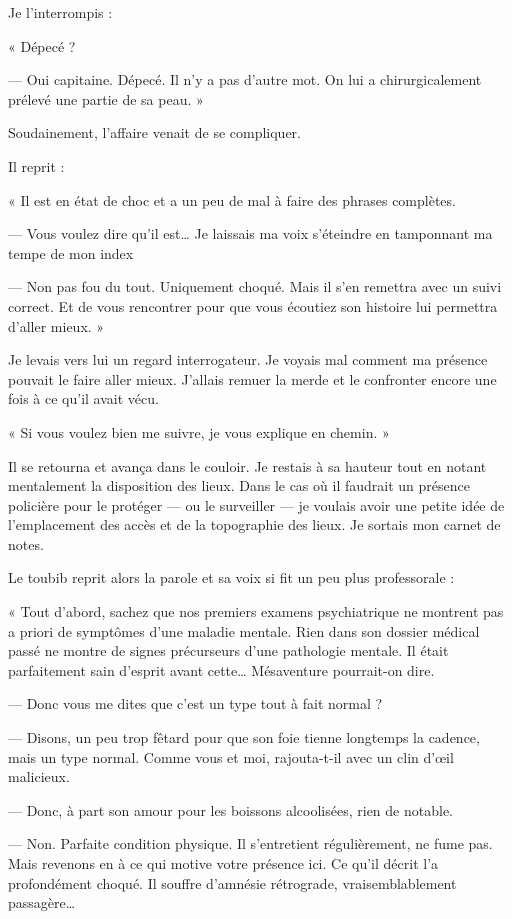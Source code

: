 Je l'interrompis :

« Dépecé ? 

— Oui capitaine. Dépecé. Il n'y a pas d'autre mot. On lui a chirurgicalement prélevé une partie de sa peau. »

Soudainement, l'affaire venait de se compliquer.

Il reprit : 

« Il est en état de choc et a un peu de mal à faire des phrases complètes.

— Vous voulez dire qu'il est… Je laissais ma voix s'éteindre en tamponnant ma tempe de mon index

— Non pas fou du tout. Uniquement choqué. Mais il s'en remettra avec un suivi correct. Et de vous rencontrer pour que 
vous écoutiez son histoire lui permettra d'aller mieux. »

Je levais vers lui un regard interrogateur. Je voyais mal comment ma présence pouvait le faire aller mieux. J'allais 
remuer la merde et le confronter encore une fois à ce qu'il avait vécu. 

« Si vous voulez bien me suivre, je vous explique en chemin. »

Il se retourna et avança dans le couloir. Je restais à sa hauteur tout en notant mentalement la disposition des lieux.
Dans le cas où il faudrait un présence policière pour le protéger — ou le surveiller — je voulais avoir une petite idée
de l'emplacement des accès et de la topographie des lieux. Je sortais mon carnet de notes.

Le toubib reprit alors la parole et sa voix si fit un peu plus professorale :

« Tout d'abord, sachez que nos premiers examens psychiatrique ne montrent pas a priori de symptômes d'une maladie
mentale. Rien dans son dossier médical passé ne montre de signes précurseurs d'une pathologie mentale. Il était 
parfaitement sain d'esprit avant cette… Mésaventure pourrait-on dire.

— Donc vous me dites que c'est un type tout à fait normal ?

— Disons, un peu trop fêtard pour que son foie tienne longtemps la cadence, mais un type normal. Comme vous et moi, 
rajouta-t-il avec un clin d'œil malicieux.

— Donc, à part son amour pour les boissons alcoolisées, rien de notable.

— Non. Parfaite condition physique. Il s'entretient régulièrement, ne fume pas. Mais revenons en à ce qui motive votre
présence ici. Ce qu'il décrit l'a profondément choqué. Il souffre d'amnésie rétrograde, vraisemblablement passagère…

